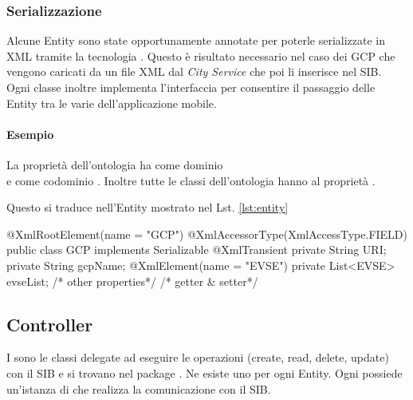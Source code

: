 \subsubsection{Serializzazione} 

Alcune Entity sono state opportunamente annotate per poterle serializzate in XML tramite la tecnologia . Questo è risultato necessario nel caso dei GCP che vengono caricati da un file XML dal \emph{City Service} che poi li inserisce nel SIB. Ogni classe inoltre implementa l'interfaccia  per consentire il passaggio delle Entity tra le varie  dell'applicazione mobile.

\paragraph{Esempio}

La proprietà dell'ontologia  ha come dominio \\  e come codominio . Inoltre tutte le classi dell'ontologia hanno al proprietà .

Questo si traduce nell'Entity mostrato nel Lst. \ref{lst:entity}

\begin{java}[caption={Entity di esempio},label={lst:entity}]
@XmlRootElement(name = "GCP")
@XmlAccessorType(XmlAccessType.FIELD)
public class GCP implements Serializable {
	@XmlTransient
	private String URI;
	private String gcpName;
	@XmlElement(name = "EVSE")
	private List<EVSE> evseList;
	/* other properties*/
	/* getter & setter*/	
}
\end{java}

\subsection{Controller}

I  sono le classi delegate ad eseguire le operazioni  (create, read, delete, update) con il SIB e si trovano nel package . Ne esiste uno per ogni Entity. Ogni  possiede un'istanza di  che realizza la comunicazione con il SIB. 

